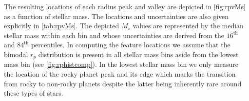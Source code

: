 \documentclass[twocolumn]{emulateapj}
\begin{document}


The resulting locations of each radius peak and valley are depicted in \autoref{fig:rpvMs} as a function of
stellar mass. The locations and uncertainties are also given explicitly in \autoref{tab:rpvMs}.
The depicted $M_s$ values are represented by the median stellar mass within each bin and whose
uncertainties are derived from the $16^{\text{th}}$ and $84^{\text{th}}$ percentiles. In computing the
feature locations we assume that the bimodal $r_p$ distribution is present in all stellar mass bins
aside from the lowest mass bin (see \autoref{fig:rphistcomp}). In the lowest stellar mass bin we
only measure the location of the rocky planet peak and its edge which marks the transition from
rocky to non-rocky planets despite the latter being inherently rare around these types of stars.


\end{document}
